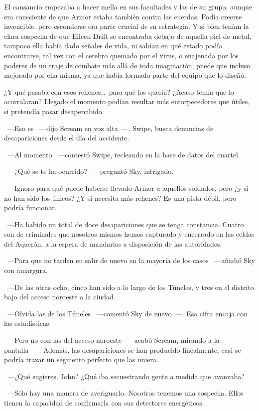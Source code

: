 El cansancio empezaba a hacer mella en sus facultades y las de su grupo, aunque era consciente de que Armor estaba también contra las cuerdas. Podía creerse invencible, pero esconderse era parte crucial de su estrategia. Y si bien tenían la clara sospecha de que Eileen Drift se encontraba debajo de aquella piel de metal, tampoco ella había dado señales de vida, ni sabían en qué estado podía encontrarse, tal vez con el cerebro quemado por el virus, o enajenada por los poderes de un traje de combate más allá de toda imaginación, puede que incluso mejorado por ella misma, ya que había formado parte del equipo que lo diseñó.

¿Y qué pasaba con esos rehenes\dots\ para qué los quería? ¿Acaso temía que lo acorralaran? Llegado el momento podían resultar más entorpecedores que útiles, si pretendía pasar desapercibido.

~---Eso es ~---dijo Scream en voz alta~---. Swipe, busca denuncias de desapariciones desde el día del accidente.

~---Al momento ~---contestó Swipe, tecleando en la base de datos del cuartel.

~---¿Qué se te ha ocurrido? ~---preguntó Sky, intrigado.

~---Ignoro para qué puede haberse llevado Armor a aquellos soldados, pero ¿y si no han sido los únicos? ¿Y si necesita más rehenes? Es una pista débil, pero podría funcionar.

~---Ha habido un total de doce desapariciones que se tenga constancia. Cuatro son de criminales que nosotros mismos hemos capturado y encerrado en las celdas del Aquerón, a la espera de mandarlos a disposición de las autoridades.

~---Para que no tarden en salir de nuevo en la mayoría de los casos ~---añadió Sky con amargura.

~---De las otras ocho, cinco han sido a lo largo de los Túneles, y tres en el distrito bajo del acceso noroeste a la ciudad.

~---Olvida las de los Túneles ~---comentó Sky de nuevo~---. Esa cifra encaja con las estadísticas.

~---Pero no con las del acceso noroeste ~---acabó Scream, mirando a la pantalla~---. Además, las desapariciones se han producido linealmente, casi se podría trazar un segmento perfecto que las uniera.

~---¿Qué sugieres, John? ¿Qué iba secuestrando gente a medida que avanzaba?

~---Sólo hay una manera de averiguarlo. Nosotros tenemos una sospecha. Ellos tienen la capacidad de confirmarla con sus detectores energéticos.

